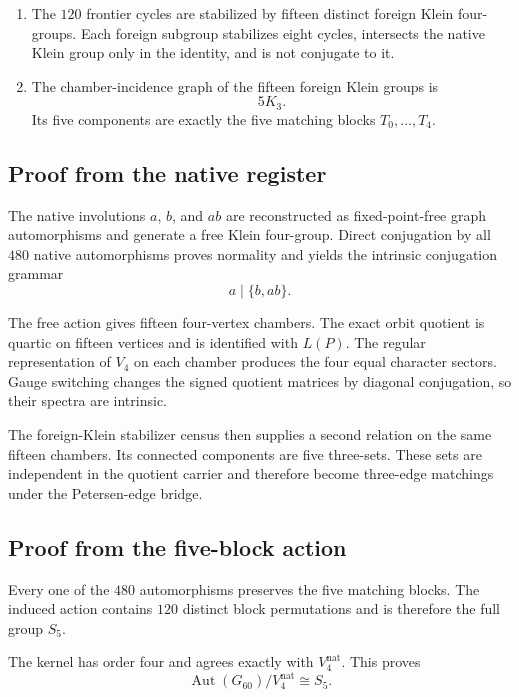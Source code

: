 \begin{theorem}
\begin{enumerate}
    \item The \(120\) frontier cycles are stabilized by fifteen
    distinct foreign Klein four-groups. Each foreign subgroup
    stabilizes eight cycles, intersects the native Klein group only
    in the identity, and is not conjugate to it.

    \item The chamber-incidence graph of the fifteen foreign Klein
    groups is
    \[
    5K_3.
    \]
    Its five components are exactly the five matching blocks
    \(T_0,\ldots,T_4\).
\end{enumerate}
\end{theorem}

\subsection{Proof from the native register}

The native involutions \(a\), \(b\), and \(ab\) are reconstructed as
fixed-point-free graph automorphisms and generate a free Klein
four-group. Direct conjugation by all \(480\) native automorphisms
proves normality and yields the intrinsic conjugation grammar
\[
a\mid\{b,ab\}.
\]

The free action gives fifteen four-vertex chambers. The exact orbit
quotient is quartic on fifteen vertices and is identified with
\(L(P)\). The regular representation of \(V_4\) on each chamber
produces the four equal character sectors. Gauge switching changes
the signed quotient matrices by diagonal conjugation, so their spectra
are intrinsic.

The foreign-Klein stabilizer census then supplies a second relation
on the same fifteen chambers. Its connected components are five
three-sets. These sets are independent in the quotient carrier and
therefore become three-edge matchings under the Petersen-edge bridge.

\subsection{Proof from the five-block action}

Every one of the \(480\) automorphisms preserves the five matching
blocks. The induced action contains \(120\) distinct block
permutations and is therefore the full group \(S_5\).

The kernel has order four and agrees exactly with
\(V_4^{\mathrm{nat}}\). This proves
\[
\operatorname{Aut}(G_{60})/V_4^{\mathrm{nat}}
\cong
S_5.
\]

